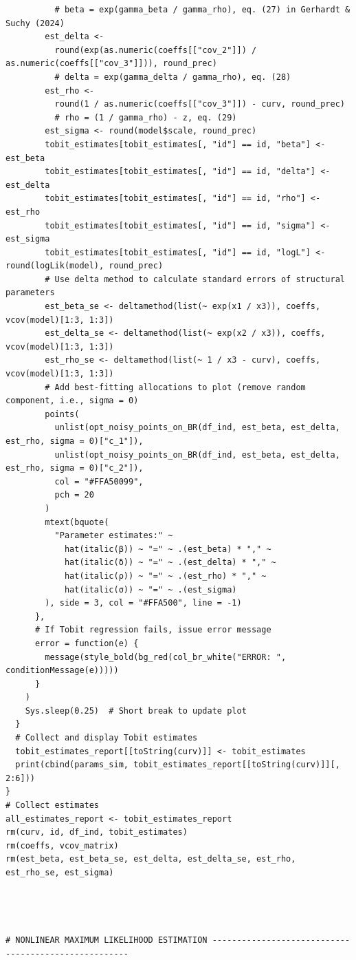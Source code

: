\documentclass[11pt, a4paper, oneside]{article}
\theoremstyle{Plain}
\theoremstyle{Definition}
\theoremstyle{Remark}
\begin{document}
\begin{appendix}
\begin{lstlisting}
          # beta = exp(gamma_beta / gamma_rho), eq. (27) in Gerhardt & Suchy (2024)
        est_delta <-
          round(exp(as.numeric(coeffs[["cov_2"]]) / as.numeric(coeffs[["cov_3"]])), round_prec)
          # delta = exp(gamma_delta / gamma_rho), eq. (28)
        est_rho <-
          round(1 / as.numeric(coeffs[["cov_3"]]) - curv, round_prec)
          # rho = (1 / gamma_rho) - z, eq. (29)
        est_sigma <- round(model$scale, round_prec)
        tobit_estimates[tobit_estimates[, "id"] == id, "beta"] <- est_beta
        tobit_estimates[tobit_estimates[, "id"] == id, "delta"] <- est_delta
        tobit_estimates[tobit_estimates[, "id"] == id, "rho"] <- est_rho
        tobit_estimates[tobit_estimates[, "id"] == id, "sigma"] <- est_sigma
        tobit_estimates[tobit_estimates[, "id"] == id, "logL"] <- round(logLik(model), round_prec)
        # Use delta method to calculate standard errors of structural parameters
        est_beta_se <- deltamethod(list(~ exp(x1 / x3)), coeffs, vcov(model)[1:3, 1:3])
        est_delta_se <- deltamethod(list(~ exp(x2 / x3)), coeffs, vcov(model)[1:3, 1:3])
        est_rho_se <- deltamethod(list(~ 1 / x3 - curv), coeffs, vcov(model)[1:3, 1:3])
        # Add best-fitting allocations to plot (remove random component, i.e., sigma = 0)
        points(
          unlist(opt_noisy_points_on_BR(df_ind, est_beta, est_delta, est_rho, sigma = 0)["c_1"]),
          unlist(opt_noisy_points_on_BR(df_ind, est_beta, est_delta, est_rho, sigma = 0)["c_2"]),
          col = "#FFA50099",
          pch = 20
        )
        mtext(bquote(
          "Parameter estimates:" ~
            hat(italic(β)) ~ "=" ~ .(est_beta) * "," ~
            hat(italic(δ)) ~ "=" ~ .(est_delta) * "," ~
            hat(italic(ρ)) ~ "=" ~ .(est_rho) * "," ~
            hat(italic(σ)) ~ "=" ~ .(est_sigma)
        ), side = 3, col = "#FFA500", line = -1)
      },
      # If Tobit regression fails, issue error message
      error = function(e) {
        message(style_bold(bg_red(col_br_white("ERROR: ", conditionMessage(e)))))
      }
    )
    Sys.sleep(0.25)  # Short break to update plot
  }
  # Collect and display Tobit estimates
  tobit_estimates_report[[toString(curv)]] <- tobit_estimates
  print(cbind(params_sim, tobit_estimates_report[[toString(curv)]][, 2:6]))
}
# Collect estimates
all_estimates_report <- tobit_estimates_report
rm(curv, id, df_ind, tobit_estimates)
rm(coeffs, vcov_matrix)
rm(est_beta, est_beta_se, est_delta, est_delta_se, est_rho, est_rho_se, est_sigma)




# NONLINEAR MAXIMUM LIKELIHOOD ESTIMATION -----------------------------------------------------



\end{lstlisting}
\end{appendix}
\end{document}
